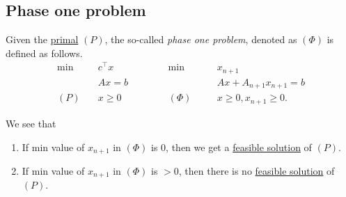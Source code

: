\subsection{Phase one problem}
\begin{definition}\label{def:phase-one-problem}
	Given the \hyperref[def:primal]{primal} \((P)\), the so-called \emph{phase one problem}, denoted as \((\Phi)\) is defined as follows.
	\[
		\begin{alignedat}{5}
			\min~&c^{\top}x\qquad\qquad&&\min~ && x_{n+1}\\
			&Ax = b 				&&		&&Ax + A_{n+1}x_{n+1} = b              \\
			(P)\quad	&x\geq  0 	&&(\Phi)\quad&&x\geq 0, x_{n+1} \geq  0.
		\end{alignedat}
	\]
\end{definition}

\begin{remark}
	We see that
	\begin{enumerate}
		\item If min value of \(x_{n+1}\) in \((\Phi)\) is 0, then we get a \hyperref[def:feasible-solution]{feasible solution} of \((P)\).
		\item If min value of \(x_{n+1}\) in \((\Phi)\) is \(>0\), then there is no \hyperref[def:feasible-solution]{feasible solution} of \((P)\).
	\end{enumerate}
\end{remark}

